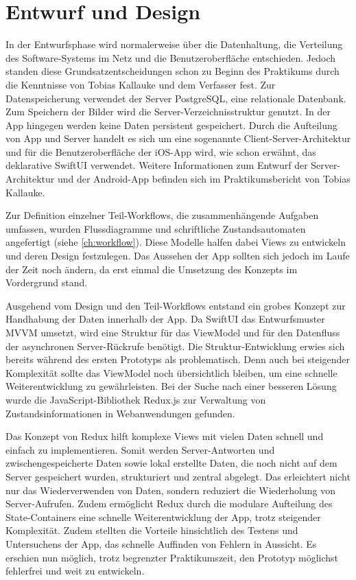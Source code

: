 \documentclass[notables, nomenclature, oneside, 150]{HSMW-Thesis}
\begin{document}
	\section{Entwurf und Design}\label{sc:entwurfunddesign}
		In der Entwurfsphase wird normalerweise über die Datenhaltung, die Verteilung des Software-Systems im Netz und die Benutzeroberfläche entschieden. Jedoch standen diese Grundsatzentscheidungen schon zu Beginn des Praktikums durch die Kenntnisse von Tobias Kallauke und dem Verfasser fest. Zur Datenspeicherung verwendet der Server PostgreSQL, eine relationale Datenbank. Zum Speichern der Bilder wird die Server-Verzeichnisstruktur genutzt. In der App hingegen werden keine Daten persistent gespeichert. Durch die Aufteilung von App und Server handelt es sich um eine sogenannte Client-Server-Architektur und für die Benutzeroberfläche der iOS-App wird, wie schon erwähnt, das deklarative SwiftUI verwendet. Weitere Informationen zum Entwurf der Server-Architektur und der Android-App befinden sich im Praktikumsbericht von Tobias Kallauke.
		
		Zur Definition einzelner Teil-Workflows, die zusammenhängende Aufgaben umfassen, wurden Flussdiagramme und schriftliche Zustandsautomaten angefertigt (siehe \autoref{ch:workflow}). Diese Modelle halfen dabei Views zu entwickeln und deren Design festzulegen. Das Aussehen der App sollten sich jedoch im Laufe der Zeit noch ändern, da erst einmal die Umsetzung des Konzepts im Vordergrund stand.

		Ausgehend vom Design und den Teil-Workflows entstand ein grobes Konzept zur Handhabung der Daten innerhalb der App. Da SwiftUI das Entwurfsmuster MVVM umsetzt, wird eine Struktur für das ViewModel und für den Datenfluss der asynchronen Server-Rückrufe benötigt. Die Struktur-Entwicklung erwies sich bereits während des ersten Prototyps als problematisch. Denn auch bei steigender Komplexität sollte das ViewModel noch übersichtlich bleiben, um eine schnelle Weiterentwicklung zu gewährleisten. Bei der Suche nach einer besseren Lösung wurde die JavaScript-Bibliothek Redux.js zur Verwaltung von Zustandsinformationen in Webanwendungen gefunden.  

		Das Konzept von Redux hilft komplexe Views mit vielen Daten schnell und einfach zu implementieren. Somit werden Server-Antworten und zwischengespeicherte Daten sowie lokal erstellte Daten, die noch nicht auf dem Server gespeichert wurden, strukturiert und zentral abgelegt. Das erleichtert nicht nur das Wiederverwenden von Daten, sondern reduziert die Wiederholung von Server-Aufrufen. Zudem ermöglicht Redux durch die modulare Aufteilung des State-Containers eine schnelle Weiterentwicklung der App, trotz steigender Komplexität. Zudem stellten die Vorteile hinsichtlich des Testens und Untersuchens der App, das schnelle Auffinden von Fehlern in Aussicht. Es erschien nun möglich, trotz begrenzter Praktikumszeit, den Prototyp möglichst fehlerfrei und weit zu entwickeln.
\end{document}
